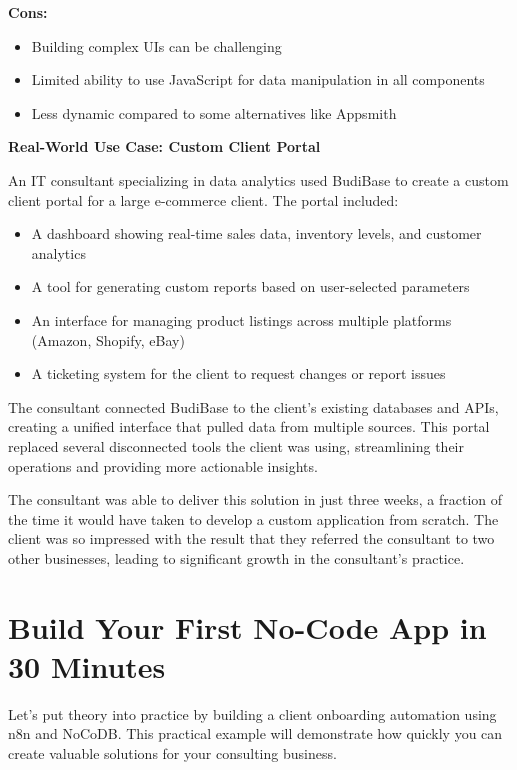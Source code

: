 \textbf{Cons:}
\begin{itemize}
    \item Building complex UIs can be challenging
    \item Limited ability to use JavaScript for data manipulation in all components
    \item Less dynamic compared to some alternatives like Appsmith
\end{itemize}

\textbf{Real-World Use Case: Custom Client Portal}

An IT consultant specializing in data analytics used BudiBase to create a custom client portal for a large e-commerce client. The portal included:

\begin{itemize}
    \item A dashboard showing real-time sales data, inventory levels, and customer analytics
    \item A tool for generating custom reports based on user-selected parameters
    \item An interface for managing product listings across multiple platforms (Amazon, Shopify, eBay)
    \item A ticketing system for the client to request changes or report issues
\end{itemize}

The consultant connected BudiBase to the client's existing databases and APIs, creating a unified interface that pulled data from multiple sources. This portal replaced several disconnected tools the client was using, streamlining their operations and providing more actionable insights.

The consultant was able to deliver this solution in just three weeks, a fraction of the time it would have taken to develop a custom application from scratch. The client was so impressed with the result that they referred the consultant to two other businesses, leading to significant growth in the consultant's practice.


\section{Build Your First No-Code App in 30 Minutes}

Let's put theory into practice by building a client onboarding automation using n8n and NoCoDB. This practical example will demonstrate how quickly you can create valuable solutions for your consulting business.

